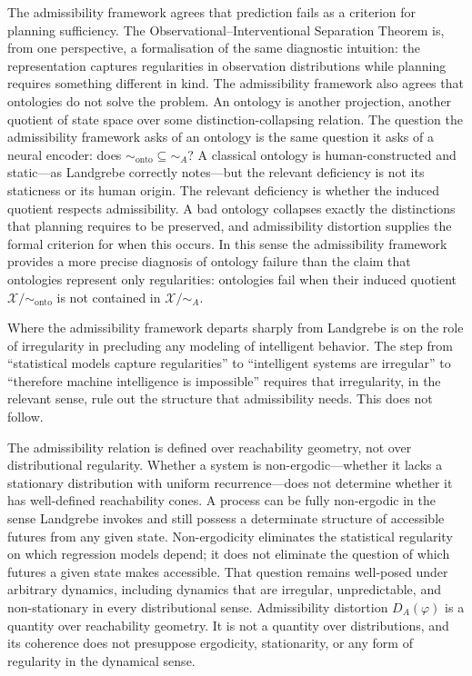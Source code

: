 \documentclass[11pt, a4paper]{article}
\theoremstyle{plain}
\theoremstyle{definition}
\theoremstyle{remark}
\newcommand{\simA}{\sim_A}
\newcommand{\DA}{D_A(\varphi)}
\begin{document}
The admissibility framework agrees that prediction fails as a criterion for planning sufficiency. The Observational--Interventional Separation Theorem is, from one perspective, a formalisation of the same diagnostic intuition: the representation captures regularities in observation distributions while planning requires something different in kind. The admissibility framework also agrees that ontologies do not solve the problem. An ontology is another projection, another quotient of state space over some distinction-collapsing relation. The question the admissibility framework asks of an ontology is the same question it asks of a neural encoder: does $\sim_{\text{onto}} \subseteq \simA$? A classical ontology is human-constructed and static---as Landgrebe correctly notes---but the relevant deficiency is not its staticness or its human origin. The relevant deficiency is whether the induced quotient respects admissibility. A bad ontology collapses exactly the distinctions that planning requires to be preserved, and admissibility distortion supplies the formal criterion for when this occurs. In this sense the admissibility framework provides a more precise diagnosis of ontology failure than the claim that ontologies represent only regularities: ontologies fail when their induced quotient $\mathcal{X}/{\sim_{\text{onto}}}$ is not contained in $\mathcal{X}/{\simA}$.

Where the admissibility framework departs sharply from Landgrebe is on the role of irregularity in precluding any modeling of intelligent behavior. The step from ``statistical models capture regularities'' to ``intelligent systems are irregular'' to ``therefore machine intelligence is impossible'' requires that irregularity, in the relevant sense, rule out the structure that admissibility needs. This does not follow.

The admissibility relation is defined over reachability geometry, not over distributional regularity. Whether a system is non-ergodic---whether it lacks a stationary distribution with uniform recurrence---does not determine whether it has well-defined reachability cones. A process can be fully non-ergodic in the sense Landgrebe invokes and still possess a determinate structure of accessible futures from any given state. Non-ergodicity eliminates the statistical regularity on which regression models depend; it does not eliminate the question of which futures a given state makes accessible. That question remains well-posed under arbitrary dynamics, including dynamics that are irregular, unpredictable, and non-stationary in every distributional sense. Admissibility distortion $\DA$ is a quantity over reachability geometry. It is not a quantity over distributions, and its coherence does not presuppose ergodicity, stationarity, or any form of regularity in the dynamical sense.
\end{document}

